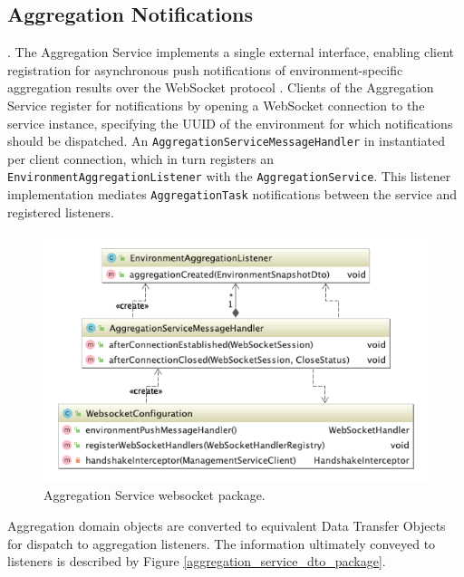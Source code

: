 \subsection{Aggregation Notifications} \label{aggregation_service_notifications}.
The Aggregation Service implements a single external interface, enabling client registration for asynchronous push notifications of environment-specific aggregation results over the WebSocket protocol \cite{WebSockets}. Clients of the Aggregation Service register for notifications by opening a WebSocket connection to the service instance, specifying the UUID of the environment for which notifications should be dispatched. An \texttt{AggregationServiceMessageHandler} in instantiated per client connection, which in turn registers an \texttt{EnvironmentAggregationListener} with the \texttt{AggregationService}. This listener implementation mediates \texttt{AggregationTask} notifications between the service and registered listeners.

\begin{figure}[H]
	\centering  
	\includegraphics[width=\linewidth]{figures/impl/aggregation/websocket_package.png}
	\caption{Aggregation Service websocket package.}
	\label{aggregation_service_websocket_package}
\end{figure}

Aggregation domain objects are converted to equivalent Data Transfer Objects for dispatch to aggregation listeners. The information ultimately conveyed to listeners is described by Figure \ref{aggregation_service_dto_package}.


